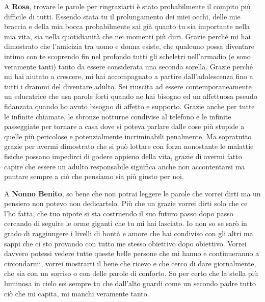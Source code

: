 \documentclass[cucitura%
,12pt%
]{toptesi}
\begin{document}
A \textbf{Rosa}, trovare le parole per ringraziarti è stato probabilmente il compito più difficile di tutti. Essendo stata tu il prolungamento dei miei occhi, delle mie braccia e della mia bocca probabilmente sai già quanto tu sia importante nella mia vita, sia nella quotidianità che nei momenti più duri. 
Grazie perché mi hai dimostrato che l’amicizia tra uomo e donna esiste, che qualcuno possa diventare intimo con te  scoprendo fin nel profondo tutti gli scheletri nell’armadio (e sono veramente tanti) tanto da essere considerata una seconda sorella. 
Grazie perché mi hai aiutato a crescere, mi hai accompagnato a partire dall’adolescenza fino a tutti i drammi del diventare adulto. Sei riuscita ad essere contemporaneamente un educatrice che usa parole forti quando ne hai bisogno ed un affettuosa pseudo fidanzata quando ho avuto bisogno di affetto e supporto.
Grazie anche per tutte le infinite chiamate, le sbronze notturne condivise al telefono e le infinite passeggiate per tornare a casa dove si poteva parlare dalle cose più stupide a quelle più pericolose e potenzialmente incriminabili penalmente. Ma sopratutto grazie per avermi dimostrato che si può lottare con 
forza nonostante le malattie fisiche possano impedirci di godere appieno della vita, grazie di avermi fatto capire che essere un adulto responsabile significa anche non accontentarsi ma puntare sempre a ciò che pensiamo sia più giusto per noi. 

A \textbf{Nonno Benito}, so bene che non potrai leggere le parole che vorrei dirti ma un pensiero non potevo non dedicartelo. Più che un grazie vorrei dirti solo che ce l’ho fatta, che tuo nipote si sta costruendo il suo futuro passo dopo passo cercando di seguire le orme giganti che tu mi hai lasciato. 
Io non so se sarò in grado di raggiungere i livelli di bontà e amore che hai condiviso con gli altri ma sappi che ci sto provando con tutto me stesso obiettivo dopo obiettivo. Vorrei davvero potessi vedere tutte queste belle persone che mi hanno e continueranno a circondarmi, vorrei mostrarti il bene
che ricevo e che cerco di dare giornalmente, che sia con un sorriso o con delle parole di conforto. So per certo che la stella più luminosa in cielo sei sempre tu che dall’alto guardi come un secondo padre tutto ciò che mi capita, mi manchi veramente tanto.


\end{document}
